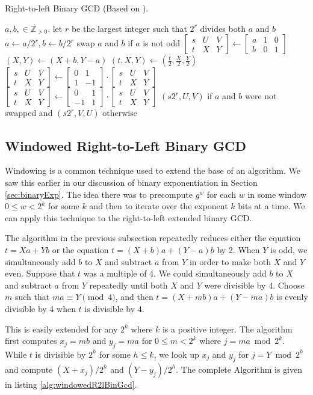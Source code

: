 \documentclass{ucalgthes1}
\theoremstyle{definition}
\newcommand{\ZZgtz}{\mathbb{Z}_{>0}}
\newcommand{\matrixtt}[4]{\left[ \begin{array}{rr} #1 & #2 \\ #3 & #4 \end{array} \right]}
\newcommand{\matrixThreeTwo}[6]{\left[ \begin{array}{rrr} #1 & #2 & #3 \\ #4 & #5 & #6 \end{array} \right]}
\begin{document}
\begin{algorithm}[h]
\caption{Right-to-left Binary GCD (Based on \cite{Stein1967}).}
\label{alg:r2lBinGcd}
\begin{algorithmic}[1]
\REQUIRE $a,b, \in \ZZgtz$.
\STATE let $r$ be the largest integer such that $2^r$ divides both $a$ and $b$
\STATE $a \gets a / 2^r, b \gets b / 2^r$
\STATE swap $a$ and $b$ if $a$ is not odd
\STATE $\matrixThreeTwo{s}{U}{V}{t}{X}{Y} \gets \matrixThreeTwo{a}{1}{0}{b}{0}{1}$
			\STATE $(X, Y) \gets (X+b, Y-a)$
		\ENDIF
		\STATE $(t, X, Y) \gets \left( \frac{t}{2}, \frac{X}{2}, \frac{Y}{2} \right)$
	\ENDWHILE
		\STATE $\matrixThreeTwo{s}{U}{V}{t}{X}{Y} \gets \matrixtt{0}{1}{1}{-1} \cdot \matrixThreeTwo{s}{U}{V}{t}{X}{Y}$
	\ELSE
		\STATE $\matrixThreeTwo{s}{U}{V}{t}{X}{Y} \gets \matrixtt{0}{1}{-1}{1} \cdot \matrixThreeTwo{s}{U}{V}{t}{X}{Y}$
	\ENDIF
\ENDWHILE
\RETURN $(s2^r, U, V)$ if $a$ and $b$ were not swapped and $(s2^r, V, U)$ otherwise
\end{algorithmic}
\end{algorithm}


\subsection{Windowed Right-to-Left Binary GCD}

Windowing is a common technique used to extend the base of an algorithm.  We saw this earlier in our discussion of binary exponentiation in Section \ref{sec:binaryExp}.  The idea there was to precompute $g^w$ for each $w$ in some window $0 \le w < 2^k$ for some $k$ and then to iterate over the exponent $k$ bits at a time.  We can apply this technique to the right-to-left extended binary GCD.

The algorithm in the previous subsection repeatedly reduces either the equation $t=Xa+Yb$ or the equation $t=(X+b)a+(Y-a)b$ by 2. When $Y$ is odd, we simultaneously add $b$ to $X$ and subtract $a$ from $Y$ in order to make both $X$ and $Y$ even.  Suppose that $t$ was a multiple of 4.  We could simultaneously add $b$ to $X$ and subtract $a$ from $Y$ repeatedly until both $X$ and $Y$ were divisible by 4.  Choose $m$ such that $ma \equiv Y \pmod 4$, and then $t = (X+mb)a + (Y-ma)b$ is evenly divisible by 4 when $t$ is divisible by 4.

This is easily extended for any $2^k$ where $k$ is a positive integer.  The algorithm first computes $x_j = mb$ and $y_j = ma$ for $0 \le m < 2^k$ where $j = ma \bmod 2^k$.  While $t$ is divisible by $2^h$ for some $h \le k$, we look up $x_j$ and $y_j$ for $j = Y \bmod 2^h$ and compute $(X + x_j) / 2^h$ and $(Y - y_j) / 2^h$.  The complete Algorithm is given in listing \ref{alg:windowedR2lBinGcd}.
\end{document}

